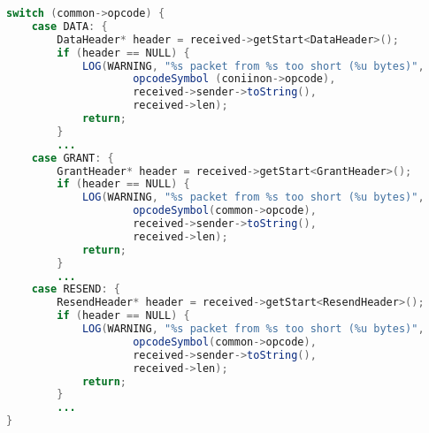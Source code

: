 \begin{lstlisting}[language=Java]
switch (common->opcode) { 
    case DATA: {
        DataHeader* header = received->getStart<DataHeader>();
        if (header == NULL) {
            LOG(WARNING, "%s packet from %s too short (%u bytes)", 
                    opcodeSymbol (coniinon->opcode), 
                    received->sender->toString(), 
                    received->len);
            return;
        }
        ...
    case GRANT: {
        GrantHeader* header = received->getStart<GrantHeader>();
        if (header == NULL) {
            LOG(WARNING, "%s packet from %s too short (%u bytes)", 
                    opcodeSymbol(common->opcode), 
                    received->sender->toString(), 
                    received->len);
            return;
        }
        ...
    case RESEND: {
        ResendHeader* header = received->getStart<ResendHeader>();
        if (header == NULL) {
            LOG(WARNING, "%s packet from %s too short (%u bytes)", 
                    opcodeSymbol(common->opcode), 
                    received->sender->toString(), 
                    received->len);
            return;
        }
        ...
}
\end{lstlisting}